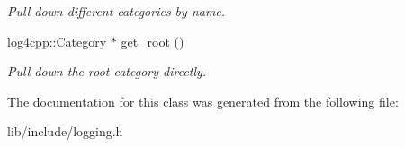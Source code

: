 \begin{DoxyCompactItemize}
\begin{DoxyCompactList}\small\item\em Pull down different categories by name. \end{DoxyCompactList}\item 
\hypertarget{classLogger_a45be5bcdda23e61d8ee6d1d8571e2bdc}{log4cpp\-::\-Category $\ast$ \hyperlink{classLogger_a45be5bcdda23e61d8ee6d1d8571e2bdc}{get\-\_\-root} ()}\label{classLogger_a45be5bcdda23e61d8ee6d1d8571e2bdc}

\begin{DoxyCompactList}\small\item\em Pull down the root category directly. \end{DoxyCompactList}\end{DoxyCompactItemize}


The documentation for this class was generated from the following file\-:\begin{DoxyCompactItemize}
\item 
lib/include/logging.\-h\end{DoxyCompactItemize}
